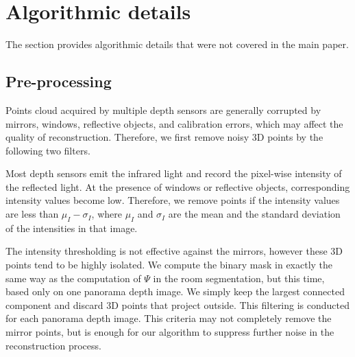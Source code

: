 \section{Algorithmic details}
The section provides algorithmic details that were not covered in the
main paper.

\subsection{Pre-processing}

Points cloud acquired by multiple depth sensors are generally corrupted
by mirrors, windows, reflective objects, and calibration errors, which
may affect the quality of reconstruction. Therefore, we first remove
noisy 3D points by the following two filters.

Most depth sensors emit the infrared
light and record the pixel-wise intensity of the reflected light. At the
presence of windows or reflective objects, corresponding intensity
values become low. Therefore, we remove points if the intensity values
are less than $\mu_I - \sigma_I$, where $\mu_I$ and $\sigma_I$ are the
mean and the standard deviation of the intensities in that image.

 The intensity thresholding
is not effective against the mirrors, however these 3D points tend to be
highly isolated. We compute the binary
mask in exactly the same way as the computation of $\Psi$ in the room
segmentation, but this time, based only on one panorama depth image. We
simply keep the largest connected component and discard 3D points that
project outside. This filtering is conducted for each panorama depth image.
%
This criteria may not completely remove the mirror points, but
is enough for our algorithm to suppress further noise in the
reconstruction process.




